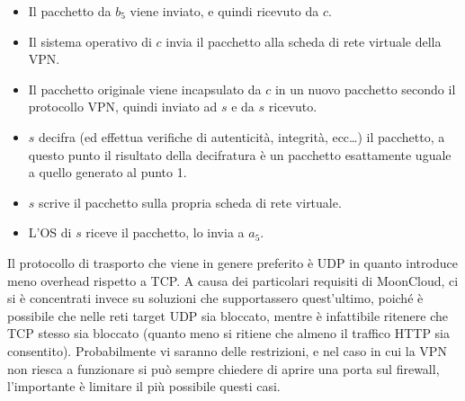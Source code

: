 \begin{itemize}
	\item Il pacchetto da $b_5$ viene inviato, e quindi ricevuto da $c$.
	\item Il sistema operativo di $c$ invia il pacchetto alla scheda di rete virtuale
	      della VPN.
	\item Il pacchetto originale viene incapsulato da $c$ in un nuovo pacchetto secondo
	      il protocollo VPN, quindi inviato ad $s$ e da $s$ ricevuto.
	\item $s$ decifra (ed effettua verifiche di autenticità, integrità, ecc\ldots) il
	      pacchetto, a questo punto il risultato della decifratura è un pacchetto esattamente
	      uguale a quello generato al punto 1.
	\item $s$ scrive il pacchetto sulla propria scheda di rete virtuale.
	\item L'OS di $s$ riceve il pacchetto, lo invia a $a_5$.
\end{itemize}


Il protocollo di trasporto che viene in genere preferito è UDP in quanto introduce meno
overhead rispetto a TCP. A causa
dei particolari requisiti di MoonCloud, ci si è concentrati invece su soluzioni che
supportassero quest'ultimo, poiché è possibile che nelle reti target UDP sia bloccato,
mentre è infattibile ritenere che TCP stesso sia bloccato (quanto meno si ritiene
che almeno il traffico HTTP sia consentito). Probabilmente vi saranno
delle restrizioni, e nel caso in cui la VPN non riesca a funzionare si può sempre
chiedere di aprire una porta sul firewall, l'importante è limitare il più possibile
questi casi.


